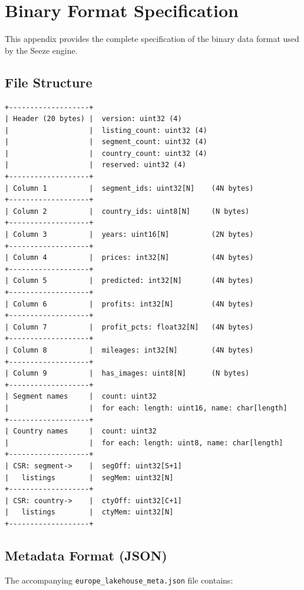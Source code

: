 \documentclass[11pt,a4paper,twoside]{book}
\begin{document}
\chapter{Binary Format Specification}

This appendix provides the complete specification of the binary data format used by the
Seeze engine.

\section{File Structure}

\begin{verbatim}
+-------------------+
| Header (20 bytes) |  version: uint32 (4)
|                   |  listing_count: uint32 (4)
|                   |  segment_count: uint32 (4)
|                   |  country_count: uint32 (4)
|                   |  reserved: uint32 (4)
+-------------------+
| Column 1          |  segment_ids: uint32[N]    (4N bytes)
+-------------------+
| Column 2          |  country_ids: uint8[N]     (N bytes)
+-------------------+
| Column 3          |  years: uint16[N]          (2N bytes)
+-------------------+
| Column 4          |  prices: int32[N]          (4N bytes)
+-------------------+
| Column 5          |  predicted: int32[N]       (4N bytes)
+-------------------+
| Column 6          |  profits: int32[N]         (4N bytes)
+-------------------+
| Column 7          |  profit_pcts: float32[N]   (4N bytes)
+-------------------+
| Column 8          |  mileages: int32[N]        (4N bytes)
+-------------------+
| Column 9          |  has_images: uint8[N]      (N bytes)
+-------------------+
| Segment names     |  count: uint32
|                   |  for each: length: uint16, name: char[length]
+-------------------+
| Country names     |  count: uint32
|                   |  for each: length: uint8, name: char[length]
+-------------------+
| CSR: segment->    |  segOff: uint32[S+1]
|   listings        |  segMem: uint32[N]
+-------------------+
| CSR: country->    |  ctyOff: uint32[C+1]
|   listings        |  ctyMem: uint32[N]
+-------------------+
\end{verbatim}

\section{Metadata Format (JSON)}

The accompanying \texttt{europe\_lakehouse\_meta.json} file contains:
\end{document}
